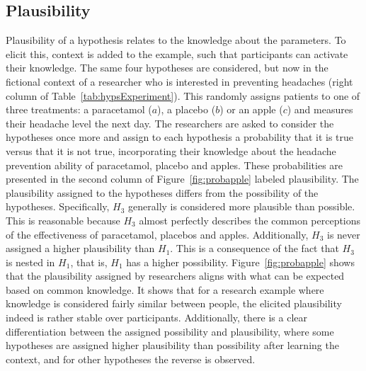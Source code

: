 \documentclass[man]{apa6}
\begin{document}
\subsection{Plausibility}
Plausibility of a hypothesis relates to the knowledge about the parameters.
To elicit this, context is added to the example, such that participants can activate their knowledge.
The same four hypotheses are considered, but now in the fictional context of a researcher who is interested in preventing headaches (right column of Table~\ref{tab:hypsExperiment}).
This randomly assigns patients to one of three treatments: a paracetamol ($a$), a placebo ($b$) or an apple ($c$) and measures their headache level the next day.
The researchers are asked to consider the hypotheses once more and assign to each hypothesis a probability that it is true versus that it is not true, incorporating their knowledge about the headache prevention ability of paracetamol, placebo and apples.
These probabilities are presented in the second column of Figure~\ref{fig:probapple} labeled plausibility.
The plausibility assigned to the hypotheses differs from the possibility of the hypotheses.
Specifically, $H_3$ generally is considered more plausible than possible.
This is reasonable because $H_3$ almost perfectly describes the common perceptions of the effectiveness of paracetamol, placebos and apples.
Additionally, $H_3$ is never assigned a higher plausibility than $H_1$.
This is a consequence of the fact that $H_3$ is nested in $H_1$, that is, $H_1$ has a higher possibility.
Figure~\ref{fig:probapple} shows that the plausibility assigned by researchers aligns with what can be expected based on common knowledge.
It shows that for a research example where knowledge is considered fairly similar between people, the elicited plausibility indeed is rather stable over participants.
Additionally, there is a clear differentiation between the assigned possibility and plausibility, where some hypotheses are assigned higher plausibility than possibility after learning the context, and for other hypotheses the reverse is observed. 
\end{document}
